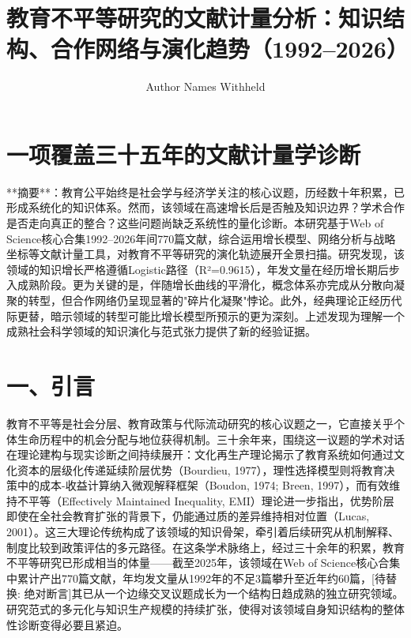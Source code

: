 \documentclass[12pt,a4paper]{article}
\title{教育不平等研究的文献计量分析：知识结构、合作网络与演化趋势（1992–2026）}
\author{Author Names Withheld}
\date{}
\begin{document}
\maketitle

\section{一项覆盖三十五年的文献计量学诊断}

**摘要**：教育公平始终是社会学与经济学关注的核心议题，历经数十年积累，已形成系统化的知识体系。然而，该领域在高速增长后是否触及知识边界？学术合作是否走向真正的整合？这些问题尚缺乏系统性的量化诊断。本研究基于Web of Science核心合集1992–2026年间770篇文献，综合运用增长模型、网络分析与战略坐标等文献计量工具，对教育不平等研究的演化轨迹展开全景扫描。研究发现，该领域的知识增长严格遵循Logistic路径（R²=0.9615），年发文量在经历增长期后步入成熟阶段。更为关键的是，伴随增长曲线的平滑化，概念体系亦完成从分散向凝聚的转型，但合作网络仍呈现显著的"碎片化凝聚"悖论。此外，经典理论正经历代际更替，暗示领域的转型可能比增长模型所预示的更为深刻。上述发现为理解一个成熟社会科学领域的知识演化与范式张力提供了新的经验证据。

\section{一、引言}

教育不平等是社会分层、教育政策与代际流动研究的核心议题之一，它直接关乎个体生命历程中的机会分配与地位获得机制。三十余年来，围绕这一议题的学术对话在理论建构与现实诊断之间持续展开：文化再生产理论揭示了教育系统如何通过文化资本的层级化传递延续阶层优势（Bourdieu, 1977），理性选择模型则将教育决策中的成本-收益计算纳入微观解释框架（Boudon, 1974; Breen, 1997），而有效维持不平等（Effectively Maintained Inequality, EMI）理论进一步指出，优势阶层即使在全社会教育扩张的背景下，仍能通过质的差异维持相对位置（Lucas, 2001）。这三大理论传统构成了该领域的知识骨架，牵引着后续研究从机制解释、制度比较到政策评估的多元路径。在这条学术脉络上，经过三十余年的积累，教育不平等研究已形成相当的体量——截至2025年，该领域在Web of Science核心合集中累计产出770篇文献，年均发文量从1992年的不足3篇攀升至近年约60篇，[待替换: 绝对断言]其已从一个边缘交叉议题成长为一个结构日趋成熟的独立研究领域。研究范式的多元化与知识生产规模的持续扩张，使得对该领域自身知识结构的整体性诊断变得必要且紧迫。
\end{document}
